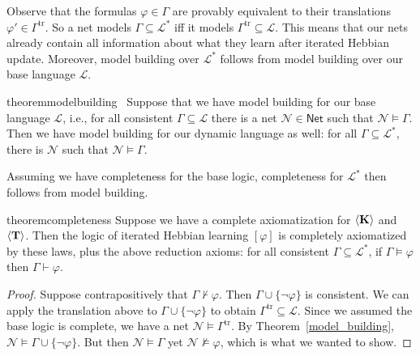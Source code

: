 \documentclass[letterpaper]{article}
\theoremstyle{definition}
\newenvironment{sketch}{\begin{proof}[Proof Sketch]}{\end{proof}}
\newcommand{\lang}{\mathcal{L}}
\newcommand{\uplang}{\mathcal{L}^\ast}
\newcommand{\set}[1]{\{ #1 \}}
\newcommand{\proves}{\vdash}
\newcommand{\AllNets}{\mathsf{Net}}
\newcommand{\Net}{\mathcal{N}}
\newcommand{\Hebbop}[1]{[#1]}
\newcommand{\diaTyp}[1]{\langle \textrm{\textup{\textbf{T}}} \rangle #1}
\newcommand{\diaKnowNoArgs}{\langle \textrm{\textup{\textbf{K}}} \rangle}
\begin{document}
Observe that the formulas $\varphi \in \Gamma$ are provably equivalent to their translations $\varphi' \in \Gamma^\mathrm{tr}$.  So a net models $\Gamma \subseteq \uplang$ iff it models $\Gamma^\mathrm{tr} \subseteq \lang$.  This means that our nets already contain all information about what they learn after iterated Hebbian update.  Moreover, model building over $\uplang$ follows from model building over our base language $\lang$.

\begin{restatable}{theorem}{modelbuilding}~\label{model_building}
Suppose that we have model building for our base language $\lang$, i.e., for all consistent $\Gamma \subseteq \lang$ there is a net $\Net \in \AllNets$ such that $\Net \models \Gamma$.  Then we have model building for our dynamic language as well: for all $\Gamma \subseteq \uplang$, there is $\Net$ such that $\Net \models \Gamma$.
\end{restatable}

Assuming we have completeness for the base logic, completeness for $\uplang$ then follows from model building.

\begin{restatable}{theorem}{completeness}\label{completeness}
    Suppose we have a complete axiomatization for $\diaKnowNoArgs$ and $\diaTyp$.  Then the logic of iterated Hebbian learning $\Hebbop{\varphi}$ is completely axiomatized by these laws, plus the above reduction axioms: for all consistent $\Gamma \subseteq \uplang$, if $\Gamma \models \varphi$ then $\Gamma \proves \varphi$.
\end{restatable}
\begin{proof}
    Suppose contrapositively that $\Gamma \not \proves \varphi$.  Then $\Gamma \cup \set{\neg \varphi}$ is consistent.  We can apply the translation above to $\Gamma \cup \set{\neg \varphi}$ to obtain $\Gamma^\mathrm{tr} \subseteq \lang$.  Since we assumed the base logic is complete, we have a net $\Net \models \Gamma^\mathrm{tr}$.  By Theorem~\ref{model_building}, $\Net \models \Gamma \cup \set{\neg \varphi}$.  But then $\Net \models \Gamma$ yet $\Net \not \models \varphi$, which is what we wanted to show.
\end{proof}
\end{document}
